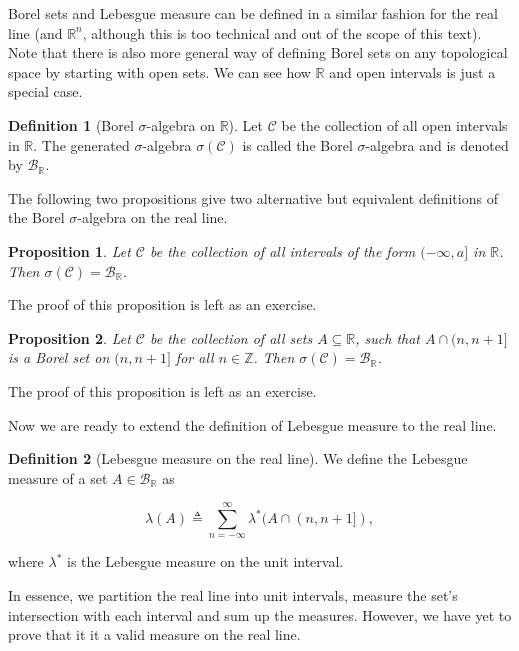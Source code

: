 \documentclass{book}
\theoremstyle{plain}%
\newtheorem{proposition}{Proposition}[section]
\theoremstyle{definition}
\newtheorem{definition}{Definition}[section]
\begin{document}
Borel sets and Lebesgue measure can be defined in a similar fashion for the real line (and $\mathbb{R}^n$, although this is too technical and out of the scope of this text). Note that there is also more general way of defining Borel sets on any topological space by starting with open sets. We can see how $\mathbb{R}$ and open intervals is just a special case.

\begin{definition}[Borel $\sigma$-algebra on $\mathbb{R}$] Let $\mathcal{C}$ be the collection of all open intervals in $\mathbb{R}$.  The generated $\sigma$-algebra $\sigma(\mathcal{C})$  is called the Borel $\sigma$-algebra and is denoted by $\mathcal{B}_\mathbb{R}$.
\end{definition}

The following two propositions give two alternative but equivalent definitions of the Borel $\sigma$-algebra on the real line.

\begin{proposition}
Let $\mathcal{C}$ be the collection of all intervals of the form $(-\infty, a]$ in $\mathbb{R}$. Then $\sigma(\mathcal{C}) = \mathcal{B}_\mathbb{R}$.\label{prop:borel1}
\end{proposition}

The proof of this proposition is left as an exercise.

\begin{proposition}
Let $\mathcal{C}$ be the collection of all sets $A \subseteq \mathbb{R}$, such that $A \cap (n, n + 1]$ is a Borel set on $(n, n + 1]$ for all $n \in \mathbb{Z}$. Then $\sigma(\mathcal{C}) = \mathcal{B}_\mathbb{R}$.\label{prop:borel2}
\end{proposition}

The proof of this proposition is left as an exercise.

Now we are ready to extend the definition of Lebesgue measure to the real line.

\begin{definition}[Lebesgue measure on the real line] We define the Lebesgue measure of a set $A \in \mathcal{B}_\mathbb{R}$ as

$$\lambda(A) \triangleq \sum_{n = -\infty}^\infty \lambda^*(A \cap (n, n+1]),$$

where $\lambda^*$ is the Lebesgue measure on the unit interval.
\end{definition}

In essence, we partition the real line into unit intervals, measure the set's intersection with each interval and sum up the measures. However, we have yet to prove that it it a valid measure on the real line.
\end{document}
